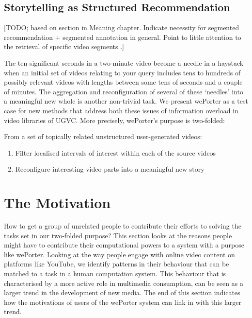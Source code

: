 \subsection{Storytelling as Structured Recommendation}

[TODO; based on section in Meaning chapter. Indicate necessity for segmented recommendation + segmented annotation in general. Point to little attention to the retrieval of specific video segments \cite{Snoek:2009dq}\cite{Kankanhalli:2008uv}.]

The ten significant seconds in a two-minute video become a needle in a haystack when an initial set of videos relating to your query includes tens to hundreds of possibly relevant videos with lengths between some tens of seconds and a couple of minutes. The aggregation and reconfiguration of several of these `needles' into a meaningful new whole is another non-trivial task. We present wePorter as a test case for new methods that address both these issues of information overload in video libraries of UGVC. More precisely, wePorter's purpose is two-folded:

From a set of topically related unstructured user-generated videos:
\begin{enumerate}
  \item Filter localised intervals of interest within each of the source videos
  \item Reconfigure interesting video parts into a meaningful new story
\end{enumerate}		

\section{The Motivation}
\label{sec:weporter_motivation}

How to get a group of unrelated people to contribute their efforts to solving the tasks set in our two-folded purpose? This section looks at the reasons people might have to contribute their computational powers to a system with a purpose like wePorter. Looking at the way people engage with online video content on platforms like YouTube, we identify patterns in their behaviour that can be matched to a task in a human computation system. This behaviour that is characterised by a more active role in multimedia consumption, can be seen as a larger trend in the development of new media. The end of this section indicates how the motivations of users of the wePorter system can link in with this larger trend.

